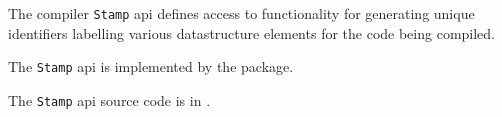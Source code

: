
The compiler {\tt Stamp} api defines access to functionality for generating unique 
identifiers labelling various datastructure elements for the code being compiled.

The {\tt Stamp} api is implemented by the  package.

The {\tt Stamp} api source code is in .

